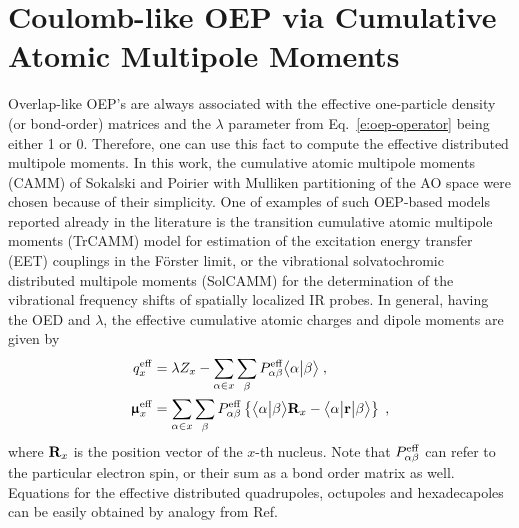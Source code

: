 \section{Coulomb-like OEP via Cumulative Atomic Multipole Moments\label{a:oep-camm}}

Overlap\hyp{}like OEP's are always associated with the effective one\hyp{}particle density
(or bond\hyp{}order) 
matrices and the $\lambda$ parameter from Eq.~\eqref{e:oep-operator} being either 1 or 0. 
Therefore, one can use this fact to compute the effective distributed multipole
moments. In this work, the cumulative atomic multipole moments (CAMM)
of Sokalski and Poirier with Mulliken partitioning of the AO space
were chosen because of their simplicity.
One of examples
of such OEP\hyp{}based models reported already in the literature is
the transition cumulative atomic multipole moments (TrCAMM) model
for estimation of the excitation energy transfer (EET) couplings in the F{\"o}rster
limit\cite{Blasiak.Maj.Cho.Gora.JCTC.2015}, 
or the vibrational solvatochromic distributed multipole moments
(SolCAMM) for the determination of the vibrational frequency shifts
of spatially localized IR probes.\cite{Blasiak.Lee.Cho.JCP.2013}
In general, having the OED and $\lambda$, the effective cumulative atomic charges
and dipole moments are given by
%
\begin{subequations} \label{e:a1-v.oep-camm}
 \begin{align} \label{e:a1-v.oep-camm.q}
  q_x^{\rm eff} &= \lambda Z_x - 
       \sum_{\alpha\in x}\sum_{\beta} 
        P_{\alpha\beta}^{\rm eff} \bigl\langle {\alpha} \bigl\lvert {\beta} \bigr\rangle \;, \\
  {\bm{\upmu}}_x^{\rm eff} &= 
       \sum_{\alpha\in x}\sum_{\beta} 
        P_{\alpha\beta}^{\rm eff}
   \left\{ 
    \bigl\langle {\alpha} \bigl\lvert {\beta} \bigr\rangle {\bf R}_x - \bigl\langle {\alpha} \bigl\lvert {\bf r} \bigl\lvert {\beta} \bigr\rangle 
   \right\}
   \;,
 \end{align}
\end{subequations}
%
where ${\bf R}_x$ is the position vector of the $x$-th nucleus.
Note that $P_{\alpha\beta}^{\rm eff}$ can refer to the particular electron
spin, or their sum as a bond order matrix as well.
Equations for the effective distributed quadrupoles, octupoles and hexadecapoles
can be easily obtained by analogy from Ref.~\cite{Blasiak.Maj.Cho.Gora.JCTC.2015}


